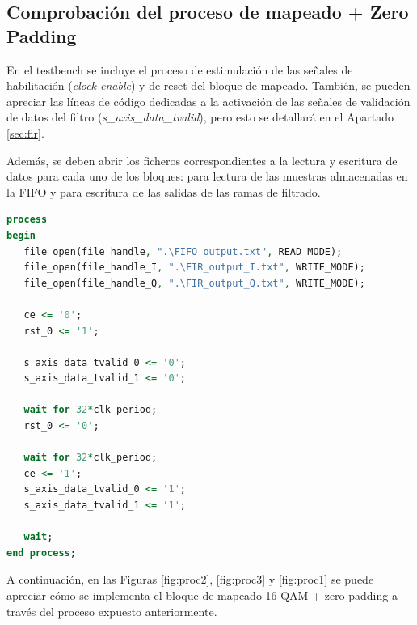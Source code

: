 \subsection{Comprobación del proceso de mapeado + Zero Padding}
\label{sec:map}

En el testbench se incluye el proceso de estimulación de las señales de habilitación (\textit{clock enable}) y de reset del bloque de mapeado. También, se pueden apreciar las líneas de código dedicadas a la activación de las señales de validación de datos del filtro (\textit{s\_axis\_data\_tvalid}), pero esto se detallará en el Apartado \ref{sec:fir}. 

\vspace{3mm}

Además, se deben abrir los ficheros correspondientes a la lectura y escritura de datos para cada uno de los bloques: para lectura de las muestras almacenadas en la FIFO y para escritura de las salidas de las ramas de filtrado.

\vspace{3mm}

\begin{lstlisting}[language=VHDL, style=mystyle, caption={Proceso de estimulación de señales de reset y clock enable}]
process
begin
   file_open(file_handle, ".\FIFO_output.txt", READ_MODE);
   file_open(file_handle_I, ".\FIR_output_I.txt", WRITE_MODE);
   file_open(file_handle_Q, ".\FIR_output_Q.txt", WRITE_MODE);
	
   ce <= '0';
   rst_0 <= '1';        
  
   s_axis_data_tvalid_0 <= '0';
   s_axis_data_tvalid_1 <= '0';
	
   wait for 32*clk_period;
   rst_0 <= '0';

   wait for 32*clk_period;
   ce <= '1';
   s_axis_data_tvalid_0 <= '1';
   s_axis_data_tvalid_1 <= '1';  
		  
   wait;
end process;  
\end{lstlisting}

\vspace{3mm}

A continuación, en las Figuras \ref{fig:proc2}, \ref{fig:proc3} y \ref{fig:proc1} se puede apreciar cómo se implementa el bloque de mapeado 16-QAM + zero-padding a través del proceso expuesto anteriormente.

